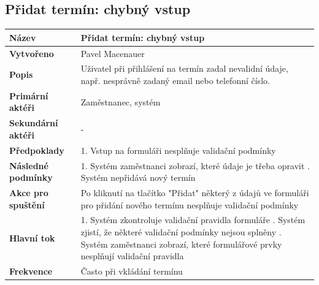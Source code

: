 \documentclass[12pt,a4paper,titlepage,final]{report}
\begin{document}
\subsection{Přidat termín: chybný vstup}
\begin{center}
    \begin{tabular}{ | p{4.5cm} | p{13cm} | }
    \hline
    \textbf{Název} & Přidat termín: chybný vstup
    \\ \hline
    
	\textbf{Vytvořeno} & Pavel Macenauer 
	\\ \hline
	
	\textbf{Popis} & Uživatel při přihlášení na termín zadal nevalidní údaje, např. nesprávně zadaný email nebo telefonní číslo.
	\\ \hline
	    
	\textbf{Primární aktéři} & Zaměstnanec, systém
	\\ \hline
	
	\textbf{Sekundární aktéři} & -	   
	\\ \hline
	
	\textbf{Předpoklady} & 1. Vstup na formuláři nesplňuje validační podmínky
    \\ \hline
    
    \textbf{Následné podmínky} & 1. Systém zaměstnanci zobrazí, které údaje je třeba opravit
	    \newline 2. Systém nepřidává nový termín
    \\ \hline 
        
    \textbf{Akce pro spuštění} & Po kliknutí na tlačítko "Přidat" některý z údajů ve formuláři pro přidání nového termínu nesplňuje validační podmínky
    \\ \hline
    
    \textbf{Hlavní tok} & 1. Systém zkontroluje validační pravidla formuláře
    	\newline 2. Systém zjistí, že některé validační podmínky nejsou splněny
    	\newline 3. Systém zaměstnanci zobrazí, které formulářové prvky nesplňují validační pravidla
    \\ \hline    
    
	\textbf{Frekvence} & Často při vkládání termínu
	\\ \hline
	\end{tabular}
\end{center}
\end{document}
